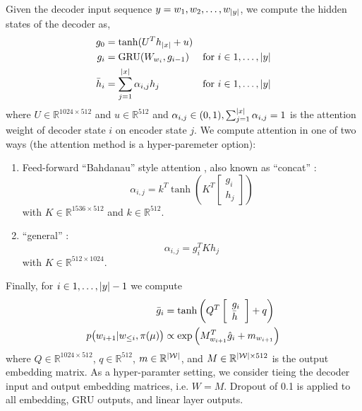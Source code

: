                 Given the decoder input sequence $y = w_1, w_2, \ldots, w_{|y|}$,
                we compute the hidden states of the decoder as,
                \begin{align*}
                        g_0 & = \tanh(U^Th_{|x|} + u) \\
                        g_i & = \operatorname{GRU}(W_{w_i}, g_{i-1}) & \textrm{for $i \in 1,\ldots, |y|$}\\
                        \bar{h}_i & = \sum^{|x|}_{j=1}\alpha_{i,j}h_j & \textrm{for $i \in 1,\ldots, |y|$}
                \end{align*}
                where $U \in \mathbb{R}^{1024 \times 512}$ and $u \in \mathbb{R}^{512}$
                and $\alpha_{i,j} \in (0, 1), \sum^{|x|}_{j=1}\alpha_{i,j} = 1$ is the attention weight of decoder state $i$ on encoder state $j$. We compute
                attention in one of two ways (the attention method is a hyper-paremeter
                option):
                \begin{enumerate}
                    \item Feed-forward ``Bahdanau'' style attention \cite{cho2014learning},
                            also known as ``concat'' \cite{luong2015effective}:
                        \[ \alpha_{i,j} = k^T\tanh\left(K^T \left[\begin{array}{c} g_i \\ h_j\end{array}\right] \right)  \] with $K\in \mathbb{R}^{1536 \times 512}$ and $k \in \mathbb{R}^{512}$.
                        \item ``general'' \cite{luong2015effective} :
                                \[ \alpha_{i,j} = g_i^T K  h_j  \] with $K \in \mathbb{R}^{512 \times 1024}$.
                        \end{enumerate}

                        Finally, for $i \in 1, \ldots, |y|-1$ we compute
                        \begin{align*}
                        \bar{g}_i & =  \tanh\left(Q^T\left[\begin{array}{l} g_i\\ \bar{h}\end{array}\right] + q\right) \\
                                p\big(w_{i+1}|w_{\le i}, \pi(\mu)\big) & \propto \exp\left(M_{w_{i+1}}^T\hat{g}_i + m_{w_{i+1}}\right)  
                        \end{align*}
                        where $Q \in \mathbb{R}^{1024 \times 512}$, $q\in\mathbb{R}^{512}$,
                        $m \in \mathbb{R}^{|\mathcal{W}|}$,
                        and $M \in \mathbb{R}^{|\mathcal{W}| \times 512}$ is the output
                            embedding matrix.
                                As a hyper-paramter setting, we consider tieing the decoder
                                    input and output
                                        embedding matrices, i.e. $W = M$.
                                            Dropout of 0.1 is applied to all embedding, GRU outputs, and linear
                                                layer outputs.


